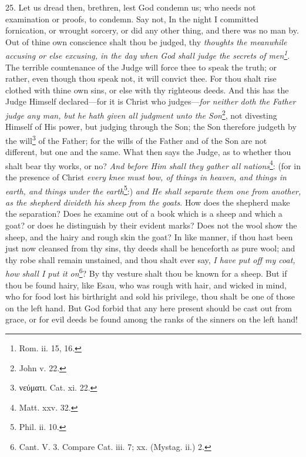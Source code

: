 25. Let us dread then, brethren, lest God condemn us; who needs not examination or proofs, to condemn. Say not, In the night I committed fornication, or wrought sorcery, or did any other thing, and there was no man by. Out of thine own conscience shalt thou be judged, thy \emph{thoughts the meanwhile accusing or else excusing, in the day when God shall judge the secrets of men\footnote{Rom. ii. 15, 16.}}. The terrible countenance of the Judge will force thee to speak the truth; or rather, even though thou speak not, it will convict thee. For thou shalt rise clothed with thine own sins, or else with thy righteous deeds. And this has the Judge Himself declared—for it is Christ who judges—\emph{for neither doth the Father judge any man, but he hath given all judgment unto the Son}\footnote{John v. 22.}, not divesting Himself of His power, but judging through the Son; the Son therefore judgeth by the will\footnote{\textgreek{νεύματι}. Cat. xi. 22.} of the Father; for the wills of the Father and of the Son are not different, but one and the same. What then says the Judge, as to whether thou shalt bear thy works, or no? \emph{And before Him shall they gather all nations}\footnote{Matt. xxv. 32.}: (for in the presence of Christ \emph{every knee must bow, of things in heaven, and things in earth, and things under the earth}\footnote{Phil. ii. 10.}:) \emph{and He shall separate them one from another, as the shepherd divideth his sheep from the goats}. How does the shepherd make the separation? Does he examine out of a book which is a sheep and which a goat? or does he distinguish by their evident marks? Does not the wool show the sheep, and the hairy and rough skin the goat? In like manner, if thou hast been just now cleansed from thy sins, thy deeds shall be henceforth as pure wool; and thy robe shall remain unstained, and thou shalt ever say, \emph{I have put off my coat, how shall I put it on}\footnote{Cant. V. 3. Compare Cat. iii. 7; xx. (Mystag. ii.) 2.}? By thy vesture shalt thou be known for a sheep. But if thou be found hairy, like Esau, who was rough with hair, and wicked in mind, who for food lost his birthright and sold his privilege, thou shalt be one of those on the left hand. But God forbid that any here present should be cast out from grace, or for evil deeds be found among the ranks of the sinners on the left hand!

